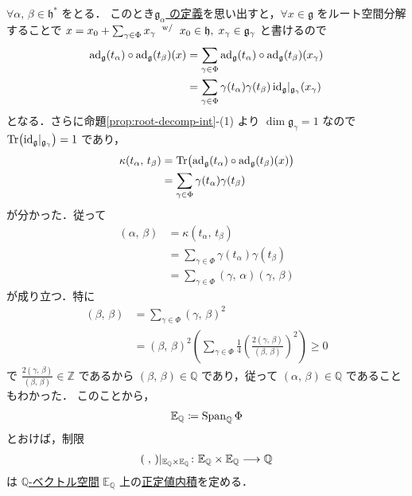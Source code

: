 \documentclass[rep_main]{subfiles}
\begin{document}
$\forall \alpha,\, \beta \in \mathfrak{h}^*$ をとる．
このとき\hyperref[def:ga]{$\mathfrak{g}_\alpha$ の定義}を思い出すと，$\forall x \in \mathfrak{g}$ をルート空間分解することで $x = x_0 + \sum_{\gamma \in \Phi} x_\gamma \mathrel{} {}^{\mathrm{w}/} \mathrel{} x_0 \in \mathfrak{h},\; x_\gamma \in \mathfrak{g}_\gamma$ と書けるので
\begin{align}
	\operatorname{ad}_{\mathfrak{g}}(t_\alpha) \circ \operatorname{ad}_{\mathfrak{g}}(t_\beta)(x)
	&= \sum_{\gamma \in \Phi} \operatorname{ad}_{\mathfrak{g}}(t_\alpha)\circ \operatorname{ad}_{\mathfrak{g}}(t_\beta)(x_\gamma) \\
	&= \sum_{\gamma \in \Phi} \gamma(t_\alpha)\gamma(t_\beta)\, \mathrm{id}_{\mathfrak{g}}|_{\mathfrak{g}_{\gamma}}(x_\gamma)
\end{align}
となる．さらに命題\ref{prop:root-decomp-int}-(1) より $\dim \mathfrak{g}_\gamma = 1$ なので $\Tr( \mathrm{id}_{\mathfrak{g}}|_{\mathfrak{g}_{\gamma}}) = 1$ であり，
\begin{align}
	\kappa(t_\alpha,\, t_\beta)
	&= \Tr \bigl( \operatorname{ad}_{\mathfrak{g}}(t_\alpha) \circ \operatorname{ad}_{\mathfrak{g}}(t_\beta)(x) \bigr) \\
	&= \sum_{\gamma \in \Phi} \gamma(t_\alpha)\gamma(t_\beta)
\end{align}
が分かった．従って
\begin{align}
	(\alpha,\, \beta) 
	&= \kappa(t_\alpha,\, t_\beta) \\
	&= \sum_{\gamma \in \Phi} \gamma(t_\alpha) \gamma(t_\beta) \\
	&= \sum_{\gamma \in \Phi} (\gamma,\, \alpha)(\gamma,\, \beta)
\end{align}
が成り立つ．特に
\begin{align}
	(\beta,\, \beta) 
	&= \sum_{\gamma \in \Phi} (\gamma,\, \beta)^2 \\
	&= (\beta,\, \beta)^2 \left(\sum_{\gamma \in \Phi} \frac{1}{4} \left( \frac{2(\gamma,\, \beta)}{(\beta,\, \beta)} \right)^2\right) \ge 0
\end{align}
で $\frac{2(\gamma,\, \beta)}{(\beta,\, \beta)} \in \mathbb{Z}$ であるから $(\beta,\, \beta) \in \mathbb{Q}$ であり，従って $(\alpha,\, \beta) \in \mathbb{Q}$ であることもわかった．
このことから，
\begin{align}
	\mathbb{E}_{\mathbb{Q}} \coloneqq \operatorname{Span}_{\mathbb{Q}} \Phi
\end{align}
とおけば，制限
\begin{align}
	(\;,\, )|_{\mathbb{E}_{\mathbb{Q}} \times \mathbb{E}_{\mathbb{Q}}} \colon \mathbb{E}_{\mathbb{Q}} \times \mathbb{E}_{\mathbb{Q}} \longrightarrow \mathbb{Q}
\end{align}
は \underline{$\mathbb{Q}$-ベクトル空間} $\mathbb{E}_{\mathbb{Q}}$ 上の\underline{正定値内積}を定める．
\end{document}
